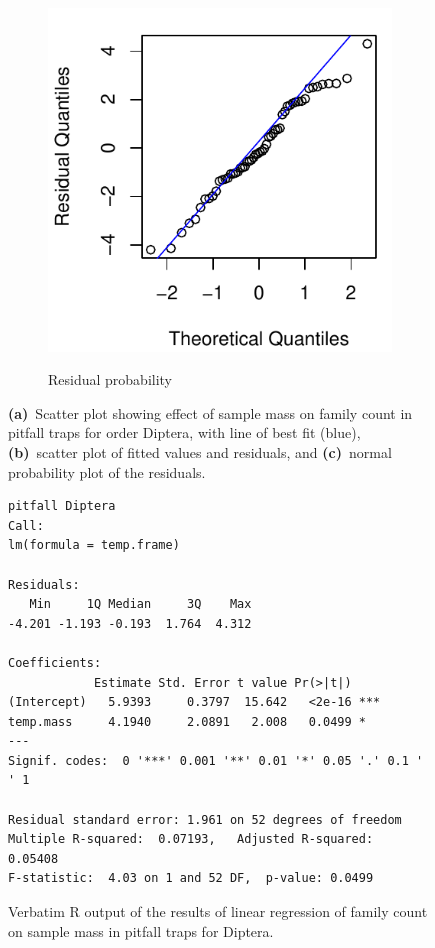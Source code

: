 \documentclass[10pt,letterpaper,twocolumn]{article}
\begin{document}
\begin{figure}[h]
\begin{subfigure}[b]{0.15\textwidth}
		\label{fig:pitfall_diptera_resid}
	\end{subfigure}
	~
	\begin{subfigure}[b]{0.15\textwidth}
		\caption{Residual probability}
		\includegraphics[width=\textwidth]{plots/mass-vs-count/qqplot/2015_pitfall_Diptera_qqplot.pdf}
		\label{fig:pitfall_diptera_qqplot}
	\end{subfigure}
	\caption{\textbf{(a)}~Scatter plot showing effect of sample mass on family count in pitfall traps for order Diptera, with line of best fit (blue), \textbf{(b)}~scatter plot of fitted values and residuals, and \textbf{(c)}~normal probability plot of the residuals.}
	\label{fig:pitfall_diptera}
	\smallskip
	\nointerlineskip
	\hrulefill
\end{figure}

\begin{figure}[h]
	\lstset{numbers=left}
	\lstset{xleftmargin=5mm,framexleftmargin=5mm}
	\begin{lstlisting}
pitfall Diptera
Call:
lm(formula = temp.frame)

Residuals:
   Min     1Q Median     3Q    Max 
-4.201 -1.193 -0.193  1.764  4.312 

Coefficients:
            Estimate Std. Error t value Pr(>|t|)    
(Intercept)   5.9393     0.3797  15.642   <2e-16 ***
temp.mass     4.1940     2.0891   2.008   0.0499 *  
---
Signif. codes:  0 '***' 0.001 '**' 0.01 '*' 0.05 '.' 0.1 ' ' 1

Residual standard error: 1.961 on 52 degrees of freedom
Multiple R-squared:  0.07193,	Adjusted R-squared:  0.05408 
F-statistic:  4.03 on 1 and 52 DF,  p-value: 0.0499
	\end{lstlisting}
	\caption{Verbatim R output of the results of linear regression of family count on sample mass in pitfall traps for Diptera.}
	\label{fig:pitfall_diptera_regression}
	\smallskip
	\nointerlineskip
	\hrulefill
\end{figure}
\end{document}
